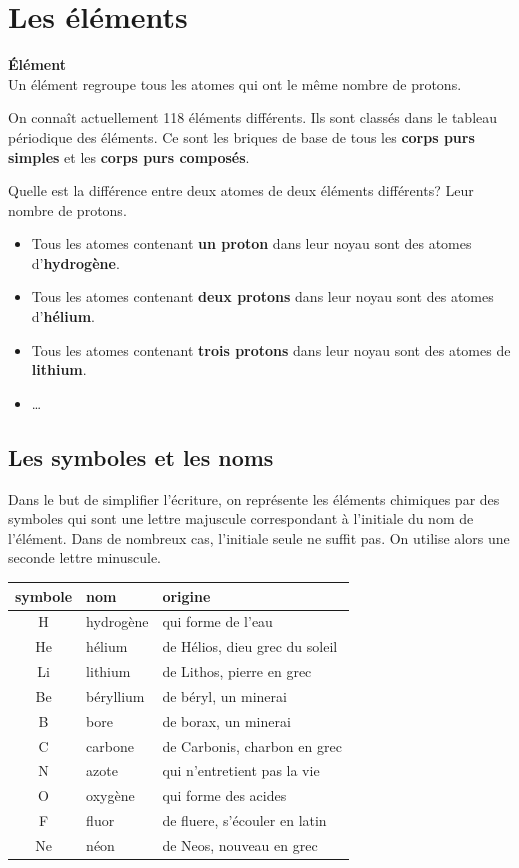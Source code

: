 \documentclass[
  11pt,
  a4paper,
  openany]{book}
\providecommand{\tightlist}{%
  \setlength{\itemsep}{0pt}\setlength{\parskip}{0pt}}
\begin{document}
\newpage

\section{Les éléments}\label{les-uxe9luxe9ments}

\begin{tcolorbox}
\textbf{Élément}\\
Un élément regroupe tous les atomes qui ont le même nombre de protons.

\end{tcolorbox}

On connaît actuellement 118 éléments différents. Ils sont classés dans le tableau périodique des éléments. Ce sont les briques de base de tous les \textbf{corps purs simples} et les \textbf{corps purs composés}.

Quelle est la différence entre deux atomes de deux éléments différents? Leur nombre de protons.

\begin{itemize}
\tightlist
\item
  Tous les atomes contenant \textbf{un proton} dans leur noyau sont des atomes d'\textbf{hydrogène}.
\item
  Tous les atomes contenant \textbf{deux protons} dans leur noyau sont des atomes d'\textbf{hélium}.
\item
  Tous les atomes contenant \textbf{trois protons} dans leur noyau sont des atomes de \textbf{lithium}.
\item
  \ldots{}
\end{itemize}

\subsection{Les symboles et les noms}\label{les-symboles-et-les-noms}

Dans le but de simplifier l'écriture, on représente les éléments chimiques par des symboles qui sont une lettre majuscule correspondant à l'initiale du nom de l'élément. Dans de nombreux cas, l'initiale seule ne suffit pas. On utilise alors une seconde lettre minuscule.

\begin{longtable}[]{@{}cll@{}}
\toprule\noalign{}
symbole & nom & origine \\
\midrule\noalign{}
\endhead
\bottomrule\noalign{}
\endlastfoot
H & hydrogène & qui forme de l'eau \\
He & hélium & de Hélios, dieu grec du soleil \\
Li & lithium & de Lithos, pierre en grec \\
Be & béryllium & de béryl, un minerai \\
B & bore & de borax, un minerai \\
C & carbone & de Carbonis, charbon en grec \\
N & azote & qui n'entretient pas la vie \\
O & oxygène & qui forme des acides \\
F & fluor & de fluere, s'écouler en latin \\
Ne & néon & de Neos, nouveau en grec \\
\end{longtable}
\end{document}
